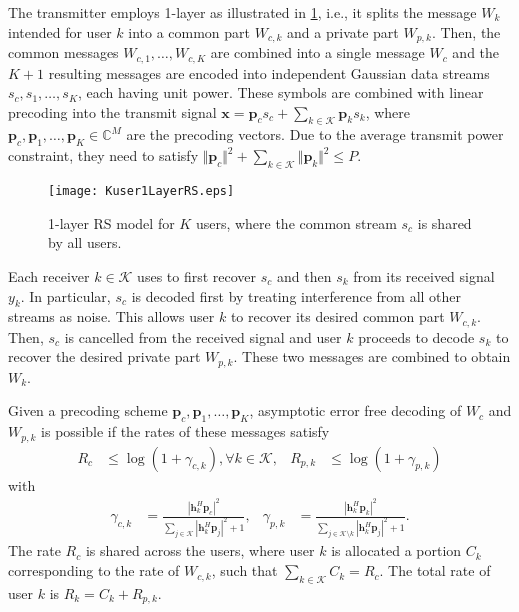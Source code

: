 \documentclass[a4paper,10pt,journal]{IEEEtran}
\let\vec\bm
\begin{document}
The transmitter employs 1-layer  \cite{mao2017eurasip,hamdi2016tcom} as illustrated in \cref{fig: 1-layer RS transmission model}, i.e., it splits the message $W_k$ intended for user $k$ into a common part $W_{c,k}$ and a private part $W_{p,k}$. Then, the common messages $W_{c,1}, \ldots, W_{c,K}$ are combined into a single message $W_c$ and the $K+1$ resulting messages are encoded into independent Gaussian data streams $s_c, s_1, \dots, s_K$, each having unit power. These symbols are combined with linear precoding into the transmit signal
$\vec x = \vec p_c s_c + \sum_{k\in\mathcal K} \vec p_k s_k$,
where $\vec p_c, \vec p_1, \dots, \vec p_K \in \mathds C^M$ are the precoding vectors.
Due to the average transmit power constraint, they need to satisfy $\Vert\vec p_c\Vert^2 + \sum_{k\in\mathcal K} \Vert\vec p_k \Vert^2 \le P$.

\begin{figure}
	\centering
	\texttt{[image: Kuser1LayerRS.eps]}%
	\caption{1-layer RS model for $K$ users, where the common stream $s_c$ is shared by all users.}
	\label{fig: 1-layer RS transmission model}
\end{figure}

Each receiver $k\in\mathcal K$ uses  to first recover $s_c$ and then $s_k$ from its received signal $y_k$.
In particular, $s_c$ is decoded first by treating interference from all other streams as noise. This allows user $k$ to recover its desired common part $W_{c,k}$.
Then,  $s_c$  is cancelled from the received signal and user $k$ proceeds to decode $s_k$ to recover the desired private part $W_{p,k}$. These two messages are combined to obtain $W_k$.

Given a precoding scheme $\vec p_c, \vec p_1, \dots, \vec p_K$, asymptotic error free decoding of $W_c$ and $W_{p,k}$ is possible if the rates of these messages satisfy 
\begin{align}
	R_c &\le \log(1 + \gamma_{c,k}), \forall k\in\mathcal{K},
	&
	R_{p,k} &\le \log(1+\gamma_{p,k})
	\label{eq: instantanesous}
\end{align}
with 
\begin{align} \label{eq: SINR cp}
	\gamma_{c,k}&=\frac{|{\vec{h}}_{k}^{H}\vec{p}_{c}|^2}{\sum\limits_{j\in\mathcal{K}}|\vec{h}_{k}^{H}\vec{p}_{j}|^2+1},
	&
	\gamma_{p,k}&=\frac{|{\vec{h}}_{k}^{H}\vec{p}_{k}|^2}{\sum\limits_{j\in\mathcal{K}\setminus k}|\vec{h}_{k}^{H}\vec{p}_{j}|^2+1}.
\end{align}
The rate $R_{c} $ is shared across the users, where
user $k$  is allocated a portion ${C}_{k}$ corresponding to the rate of $W_{c,k}$,
such that $\sum_{k \in \mathcal{K}} {C}_{k} = {R}_{c} $. The total rate of user $k$ is $R_k = C_k + R_{p,k}$.
\end{document}

